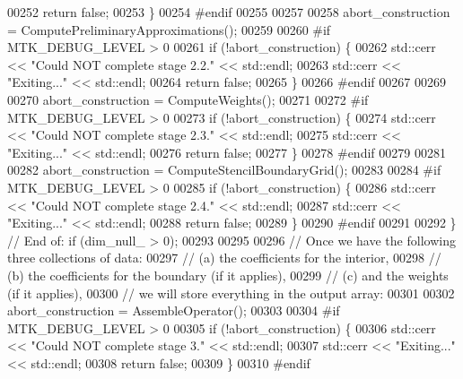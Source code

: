 \begin{DoxyCode}
{{00252       \textcolor{keywordflow}{return} \textcolor{keyword}{false};
00253     \}
00254 \textcolor{preprocessor}{    #endif}
00255 
00257 
00258     abort\_construction = ComputePreliminaryApproximations();
00259 
00260 \textcolor{preprocessor}{    #if MTK\_DEBUG\_LEVEL > 0}
00261     \textcolor{keywordflow}{if} (!abort\_construction) \{
00262       std::cerr << \textcolor{stringliteral}{"Could NOT complete stage 2.2."} << std::endl;
00263       std::cerr << \textcolor{stringliteral}{"Exiting..."} << std::endl;
00264       \textcolor{keywordflow}{return} \textcolor{keyword}{false};
00265     \}
00266 \textcolor{preprocessor}{    #endif}
00267 
00269 
00270     abort\_construction = ComputeWeights();
00271 
00272 \textcolor{preprocessor}{    #if MTK\_DEBUG\_LEVEL > 0}
00273     \textcolor{keywordflow}{if} (!abort\_construction) \{
00274       std::cerr << \textcolor{stringliteral}{"Could NOT complete stage 2.3."} << std::endl;
00275       std::cerr << \textcolor{stringliteral}{"Exiting..."} << std::endl;
00276       \textcolor{keywordflow}{return} \textcolor{keyword}{false};
00277     \}
00278 \textcolor{preprocessor}{    #endif}
00279 
00281 
00282     abort\_construction = ComputeStencilBoundaryGrid();
00283 
00284 \textcolor{preprocessor}{    #if MTK\_DEBUG\_LEVEL > 0}
00285     \textcolor{keywordflow}{if} (!abort\_construction) \{
00286       std::cerr << \textcolor{stringliteral}{"Could NOT complete stage 2.4."} << std::endl;
00287       std::cerr << \textcolor{stringliteral}{"Exiting..."} << std::endl;
00288       \textcolor{keywordflow}{return} \textcolor{keyword}{false};
00289     \}
00290 \textcolor{preprocessor}{    #endif}
00291 
00292   \} \textcolor{comment}{// End of: if (dim\_null\_ > 0);}
00293 
00295 
00296   \textcolor{comment}{// Once we have the following three collections of data:}
00297   \textcolor{comment}{//   (a) the coefficients for the interior,}
00298   \textcolor{comment}{//   (b) the coefficients for the boundary (if it applies),}
00299   \textcolor{comment}{//   (c) and the weights (if it applies),}
00300   \textcolor{comment}{// we will store everything in the output array:}
00301 
00302   abort\_construction = AssembleOperator();
00303 
00304 \textcolor{preprocessor}{  #if MTK\_DEBUG\_LEVEL > 0}
00305   \textcolor{keywordflow}{if} (!abort\_construction) \{
00306     std::cerr << \textcolor{stringliteral}{"Could NOT complete stage 3."} << std::endl;
00307     std::cerr << \textcolor{stringliteral}{"Exiting..."} << std::endl;
00308     \textcolor{keywordflow}{return} \textcolor{keyword}{false};
00309   \}
00310 \textcolor{preprocessor}{  #endif}
}}
\end{DoxyCode}
